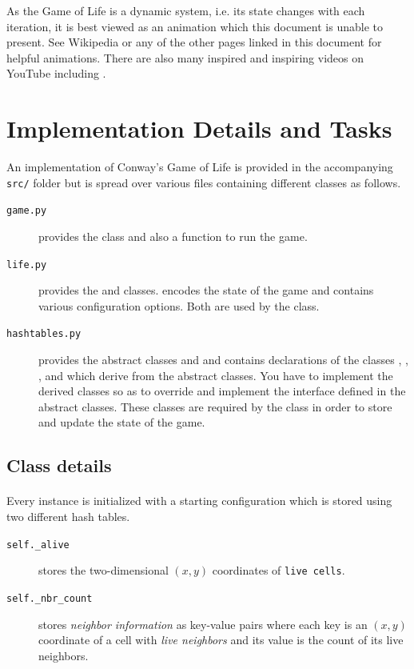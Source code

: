 \documentclass[addpoints]{exam}
\begin{document}
As the Game of Life is a dynamic system, i.e. its state changes with each iteration, it is best viewed as an animation which this document is unable to present. See Wikipedia \cite{wp_gol} or any of the other pages linked in this document for helpful animations. There are also many inspired and inspiring videos on YouTube including \cite{yt_gol}.

\section{Implementation Details and Tasks}

An implementation of Conway's Game of Life is provided in the accompanying \texttt{src/} folder but is spread over various files containing different classes as follows.
\begin{description}
\item[\texttt{game.py}] provides the  class and also a  function to run the game.
\item[\texttt{life.py}] provides the  and  classes.  encodes the state of the game and  contains various configuration options. Both are used by the  class.
\item[\texttt{hashtables.py}] provides the abstract classes  and  and contains declarations of the classes , , , and  which derive from the abstract classes. You have to implement the derived classes so as to override and implement the interface defined in the abstract classes. These classes are required by the  class in order to store and update the state of the game.
\end{description}

\subsection{Class details}

\paragraph{} Every instance is initialized with a starting configuration which is stored using two different hash tables.
\begin{description}
\item[\texttt{self.\_alive}] stores the two-dimensional $(x,y)$ coordinates of \texttt{live cells}.
\item[\texttt{self.\_nbr\_count}] stores \textit{neighbor information} as key-value pairs where each key is an $(x,y)$ coordinate of a cell with \textit{live neighbors} and its value is the count of its live neighbors.
\end{description}
\end{document}
